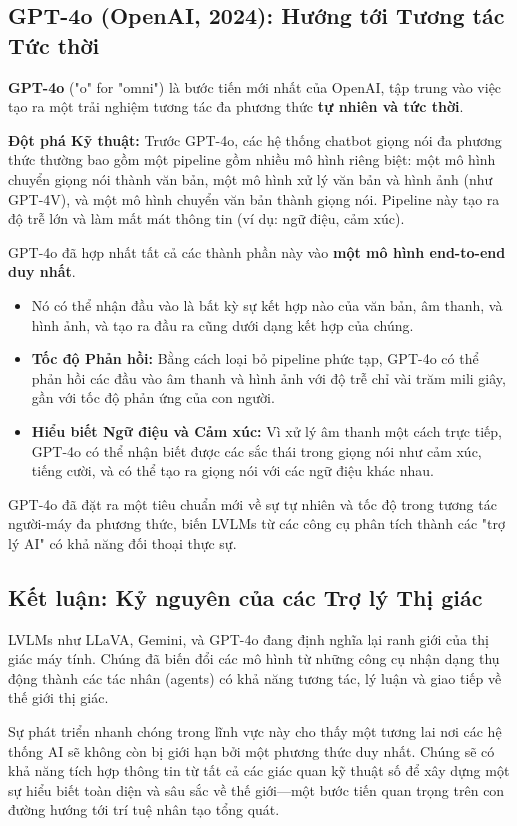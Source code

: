 \subsection{GPT-4o (OpenAI, 2024): Hướng tới Tương tác Tức thời}
\label{subsec:gpt4o}
\textbf{GPT-4o} ("o" for "omni") \cite{OpenAI2024_GPT4o} là bước tiến mới nhất của OpenAI, tập trung vào việc tạo ra một trải nghiệm tương tác đa phương thức \textbf{tự nhiên và tức thời}.

\textbf{Đột phá Kỹ thuật:}
Trước GPT-4o, các hệ thống chatbot giọng nói đa phương thức thường bao gồm một pipeline gồm nhiều mô hình riêng biệt: một mô hình chuyển giọng nói thành văn bản, một mô hình xử lý văn bản và hình ảnh (như GPT-4V), và một mô hình chuyển văn bản thành giọng nói. Pipeline này tạo ra độ trễ lớn và làm mất mát thông tin (ví dụ: ngữ điệu, cảm xúc).

GPT-4o đã hợp nhất tất cả các thành phần này vào \textbf{một mô hình end-to-end duy nhất}.
\begin{itemize}
	\item Nó có thể nhận đầu vào là bất kỳ sự kết hợp nào của văn bản, âm thanh, và hình ảnh, và tạo ra đầu ra cũng dưới dạng kết hợp của chúng.
	\item \textbf{Tốc độ Phản hồi:} Bằng cách loại bỏ pipeline phức tạp, GPT-4o có thể phản hồi các đầu vào âm thanh và hình ảnh với độ trễ chỉ vài trăm mili giây, gần với tốc độ phản ứng của con người.
	\item \textbf{Hiểu biết Ngữ điệu và Cảm xúc:} Vì xử lý âm thanh một cách trực tiếp, GPT-4o có thể nhận biết được các sắc thái trong giọng nói như cảm xúc, tiếng cười, và có thể tạo ra giọng nói với các ngữ điệu khác nhau.
\end{itemize}
GPT-4o đã đặt ra một tiêu chuẩn mới về sự tự nhiên và tốc độ trong tương tác người-máy đa phương thức, biến LVLMs từ các công cụ phân tích thành các "trợ lý AI" có khả năng đối thoại thực sự.

\subsection{Kết luận: Kỷ nguyên của các Trợ lý Thị giác}
\label{subsec:lvlm_conclusion}
LVLMs như LLaVA, Gemini, và GPT-4o đang định nghĩa lại ranh giới của thị giác máy tính. Chúng đã biến đổi các mô hình từ những công cụ nhận dạng thụ động thành các tác nhân (agents) có khả năng tương tác, lý luận và giao tiếp về thế giới thị giác.

Sự phát triển nhanh chóng trong lĩnh vực này cho thấy một tương lai nơi các hệ thống AI sẽ không còn bị giới hạn bởi một phương thức duy nhất. Chúng sẽ có khả năng tích hợp thông tin từ tất cả các giác quan kỹ thuật số để xây dựng một sự hiểu biết toàn diện và sâu sắc về thế giới—một bước tiến quan trọng trên con đường hướng tới trí tuệ nhân tạo tổng quát.

